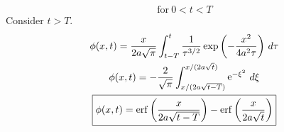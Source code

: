 {\begin{Solution}
\begin{enumerate}
\[    \mathrm{for}\ 0 < t < T
    \]
    Consider $t > T$.
    \begin{gather*}
      \phi(x,t) = \frac{x}{2 a \sqrt{\pi}} \int_{t-T}^t 
      \frac{1}{\tau^{3/2}} \exp \left( - \frac{x^2}{4 a^2 \tau} 
      \right) \,d\tau \\
      \phi(x,t) = - \frac{2}{\sqrt{\pi}} \int_{x/(2 a \sqrt{t-T})}^{x/(2 a \sqrt{t})}
      \mathop{\mathrm{e}}\nolimits^{-\xi^2} \,d \xi \\
      \boxed{
        \phi(x,t) = \mathop{\mathrm{erf}}\nolimits \left( \frac{ x }{ 2 a \sqrt{t-T} } \right)
        - \mathop{\mathrm{erf}}\nolimits \left( \frac{ x }{ 2 a \sqrt{t} } \right)
        }
    \end{gather*}
  \end{enumerate}
\end{Solution}





}
